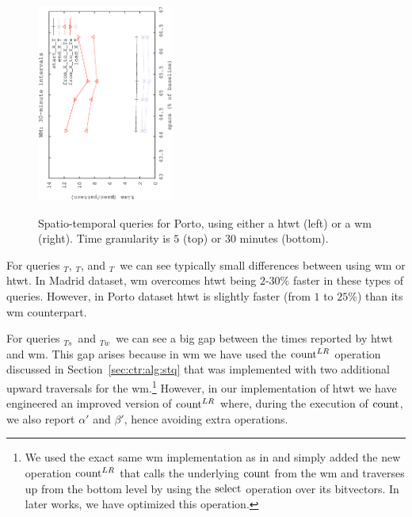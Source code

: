 \begin{figure}[ht]
\begin{center}
			{\includegraphics[angle=-90,width=0.4\textwidth]{figures_synt/porto_wm30.eps}}
		\end{center}
		\caption{Spatio-temporal queries for Porto, using either a \acrshort{htwt} (left) or a \acrshort{wm} (right). 
			Time granularity is $5$ (top) or $30$ minutes (bottom). 
		}
		\label{fig:ctr:exp:queries:st:porto}
	\end{figure}


	For queries \startX$_T$, \endX$_T$, and \loadX$_T$\ we can see typically small differences between using \gls{wm} or \gls{htwt}. In Madrid dataset, \gls{wm} overcomes \gls{htwt} being $2$-$30$\% faster in these types of queries. 
	However, in Porto dataset \gls{htwt} is slightly 
	faster (from $1$ to $25$\%) than its \gls{wm} counterpart.

	For queries \XtoY$_{Ts}$\ and \XtoY$_{Tw}$\ we can see a big gap between the times reported by \gls{htwt} and \gls{wm}.
	This gap arises because in \gls{wm} we have used the $\operatorname{count}^{LR}$ operation discussed in Section~\ref{sec:ctr:alg:stq}
	that was implemented with two additional upward traversals for the \gls{wm}.\footnote{We used the exact same \gls{wm} 
		implementation as in \cite{CNO15} and simply added the new operation $\operatorname{count}^{LR}$ that calls the underlying $\operatorname{count}$ from the
		\gls{wm} and traverses up from the bottom level by using the $\operatorname{select}$ operation over its bitvectors. In later works, we have optimized this operation.}  
	However, in our implementation of
	\gls{htwt} we have engineered an improved version of $\operatorname{count}^{LR}$ where, during the execution of $\operatorname{count}$, we also report $\alpha'$ and  $\beta'$, hence avoiding extra operations.
	

